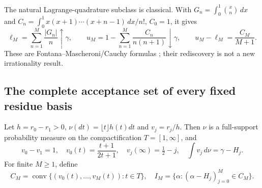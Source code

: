 \documentclass[11pt,a4paper]{article}
\theoremstyle{definition}
\theoremstyle{remark}
\numberwithin{equation}{section}
\begin{document}
The natural Lagrange-quadrature subclass is classical.  With
$G_n=\int_0^1\binom xn\,dx$ and
$C_n=\int_0^1x(x+1)\cdots(x+n-1)\,dx/n!$, $C_0=1$, it gives
\[
 \ell_M=\sum_{n=1}^M\frac{|G_n|}{n}\uparrow\gamma,\qquad
 u_M=1-\sum_{n=1}^M\frac{C_n}{n(n+1)}\downarrow\gamma,
 \qquad u_M-\ell_M=\frac{C_M}{M+1}.
\]
These are Fontana--Mascheroni/Cauchy formulas \cite{ar:Blagouchine}; their
rediscovery is not a new irrationality result.

\subsection{The complete acceptance set of every fixed residue basis}
Let $h=r_0-r_1>0$, $\nu(dt)=\lfloor t\rfloor h(t)dt$ and
$v_j=r_j/h$.  Then $\nu$ is a full-support probability measure on the
compactification $T=[1,\infty]$, and
\[
 v_0-v_1=1,\quad v_0(t)=\frac{t+1}{2t+1},\quad
 v_j(\infty)=\tfrac12-j,\quad
 \int v_j\,d\nu=\gamma-H_j.
\]
For finite $M\ge1$, define
\[
 C_M=\operatorname{conv}\{(v_0(t),\ldots,v_M(t)):t\in T\},\quad
 I_M=\{\alpha:(\alpha-H_j)_{j=0}^M\in C_M\}.
\]
\end{document}
